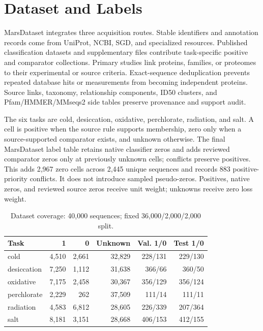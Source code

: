 \documentclass[conference]{IEEEtran}
\begin{document}
\section{Dataset and Labels}

MarsDataset integrates three acquisition routes. Stable identifiers and annotation records come from UniProt, NCBI, SGD, and specialized resources. Published classification datasets and supplementary files contribute task-specific positive and comparator collections. Primary studies link proteins, families, or proteomes to their experimental or source criteria. Exact-sequence deduplication prevents repeated database hits or measurements from becoming independent proteins. Source links, taxonomy, relationship components, ID50 clusters, and Pfam/HMMER/MMseqs2 side tables preserve provenance and support audit.

The six tasks are cold, desiccation, oxidative, perchlorate, radiation, and salt. A cell is positive when the source rule supports membership, zero only when a source-supported comparator exists, and unknown otherwise. The final MarsDataset label table retains native classifier zeros and adds reviewed comparator zeros only at previously unknown cells; conflicts preserve positives. This adds 2,967 zero cells across 2,445 unique sequences and records 883 positive-priority conflicts. It does not introduce sampled pseudo-zeros. Positives, native zeros, and reviewed source zeros receive unit weight; unknowns receive zero loss weight.

\begin{table}[t]
\centering
\caption{Dataset coverage: 40,000 sequences; fixed 36,000/2,000/2,000 split.}
\label{tab:1}
\footnotesize
\setlength{\tabcolsep}{3pt}
\begin{tabularx}{\columnwidth}{@{}Xrrrrr@{}}
\toprule
Task & 1 & 0 & Unknown & Val. 1/0 & Test 1/0 \\
\midrule
cold & 4,510 & 2,661 & 32,829 & 228/131 & 229/130 \\
desiccation & 7,250 & 1,112 & 31,638 & 366/66 & 360/50 \\
oxidative & 7,175 & 2,458 & 30,367 & 356/129 & 356/124 \\
perchlorate & 2,229 & 262 & 37,509 & 111/14 & 111/11 \\
radiation & 4,583 & 6,812 & 28,605 & 226/339 & 207/364 \\
salt & 8,181 & 3,151 & 28,668 & 406/153 & 412/155 \\
\bottomrule
\end{tabularx}
\end{table}
\end{document}
